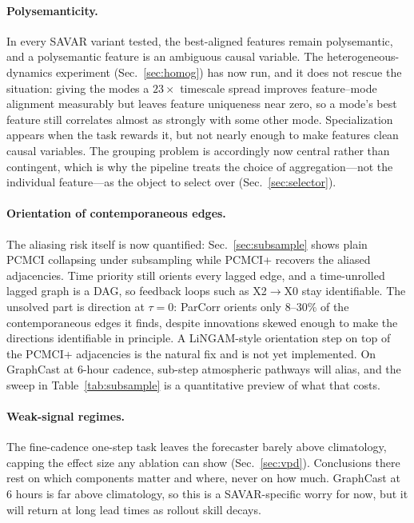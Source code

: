 \paragraph{Polysemanticity.} In every SAVAR variant tested, the best-aligned
features remain polysemantic, and a polysemantic feature is an ambiguous causal
variable. The heterogeneous-dynamics experiment (Sec.~\ref{sec:homog}) has now
run, and it does not rescue the situation: giving the modes a $23\times$ timescale
spread improves feature--mode alignment measurably but leaves feature uniqueness
near zero, so a mode's best feature still correlates almost as strongly with some
other mode. Specialization appears when the task rewards it, but not nearly enough
to make features clean causal variables. The grouping problem is accordingly now
central rather than contingent, which is why the pipeline treats the choice of
aggregation---not the individual feature---as the object to select over
(Sec.~\ref{sec:selector}).

\paragraph{Orientation of contemporaneous edges.} The aliasing risk itself is now
quantified: Sec.~\ref{sec:subsample} shows plain PCMCI collapsing under
subsampling while PCMCI+ recovers the aliased adjacencies. Time priority still
orients every lagged edge, and a time-unrolled lagged graph is a DAG, so feedback
loops such as X2$\to$X0 stay identifiable. The unsolved part is direction at
$\tau=0$: ParCorr orients only $8$--$30\%$ of the contemporaneous edges it finds,
despite innovations skewed enough to make the directions identifiable in
principle. A LiNGAM-style orientation step on top of the PCMCI+ adjacencies is the
natural fix and is not yet implemented. On GraphCast at 6-hour cadence, sub-step
atmospheric pathways will alias, and the sweep in Table~\ref{tab:subsample} is a
quantitative preview of what that costs.

\paragraph{Weak-signal regimes.} The fine-cadence one-step task leaves the
forecaster barely above climatology, capping the effect size any ablation can
show (Sec.~\ref{sec:vpd}). Conclusions there rest on which components matter and
where, never on how much. GraphCast at 6 hours is far above climatology, so this
is a SAVAR-specific worry for now, but it will return at long lead times as
rollout skill decays.

